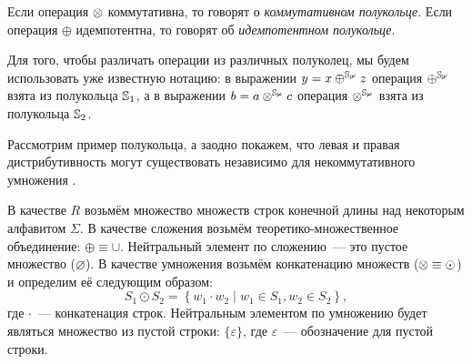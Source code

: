 Если операция $\otimes$ коммутативна, то говорят о \emph{коммутативном полукольце}.
Если операция $\oplus$ идемпотентна, то говорят об \emph{идемпотентном полукольце}.

Для того, чтобы различать операции из различных полуколец, мы будем использовать уже известную нотацию: в выражении $y = x \oplus^{\mathbb{\mathbb{S}_1}} z$ операция $\oplus^{\mathbb{\mathbb{S}_1}}$ взята из полукольца $\mathbb{S}_1$, а в выражении $b = a \otimes^{\mathbb{\mathbb{S}_2}} c$ операция $\otimes^{\mathbb{\mathbb{S}_2}}$ взята из полукольца $\mathbb{S}_2$.

\begin{example}
    \label{exmpl:semiring}
    Рассмотрим пример полукольца, а заодно покажем, что левая и правая дистрибутивность могут существовать независимо для некоммутативного умножения%
    .

    В качестве $R$ возьмём множество множеств строк конечной длины над некоторым алфавитом $\Sigma$.
    В качестве сложения возьмём теоретико-множественное объединение: $\oplus \equiv \cup$.
    Нейтральный элемент по сложению~--- это пустое множество ($\varnothing$).
    В качестве умножения возьмём конкатенацию множеств ($\otimes \equiv \odot$) и определим её следующим образом:
    \[S_1 \odot S_2 = \left\{ w_1 \cdot w_2 \mid w_1 \in S_1, w_2 \in S_2\right\},\]
    где $\cdot$~--- конкатенация строк.
    Нейтральным элементом по умножению будет являться множество из пустой строки: $\{\varepsilon\}$, где $\varepsilon$~--- обозначение для пустой строки.


\end{example}
